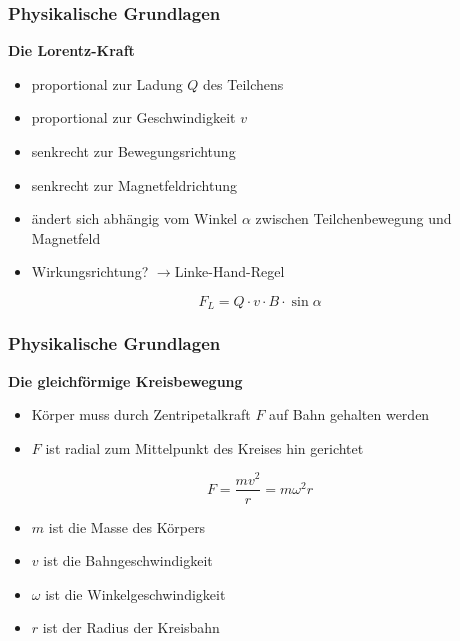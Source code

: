 \mode*

\begin{frame}
  \frametitle{Physikalische Grundlagen}
  \onslide<+->
  \textbf{Die Lorentz-Kraft}
  \begin{itemize}
    \item<+-> proportional zur Ladung \(Q\) des Teilchens
    \item<+-> proportional zur Geschwindigkeit \(v\)
    \item<+-> senkrecht zur Bewegungsrichtung
    \item<+-> senkrecht zur Magnetfeldrichtung
    \item<+-> \"andert sich abh\"angig vom Winkel \(\alpha\) zwischen Teilchenbewegung und Magnetfeld
    \item<+-> Wirkungsrichtung? \(\rightarrow\)Linke-Hand-Regel
  \end{itemize}
  \vspace*{\fill}
  \onslide<+->
  \begin{equation*}
    \label{eq:lorentz_abs}
    F_L = Q \cdot v \cdot B \cdot \sin{\alpha}
  \end{equation*}
  \vspace*{\fill}
\end{frame}

\begin{frame}
  \frametitle{Physikalische Grundlagen}
  \onslide<+->
  \textbf{Die gleichf\"ormige Kreisbewegung}
  \begin{itemize}
    \item<+-> K\"orper muss durch Zentripetalkraft \(F\) auf Bahn gehalten werden
    \item<+-> \(F\) ist radial zum Mittelpunkt des Kreises hin gerichtet
  \end{itemize}
  \vspace*{\fill}
  \onslide<+->
  \begin{equation*}
    \label{eq:zentripetalkraft}
    F = \frac{mv^2}{r} = m\omega^2r
  \end{equation*}
  \vspace*{\fill}
  \begin{itemize}
    \item<+-> \(m\) ist die Masse des K\"orpers
    \item<+-> \(v\) ist die Bahngeschwindigkeit
    \item<+-> \(\omega\) ist die Winkelgeschwindigkeit
    \item<+-> \(r\) ist der Radius der Kreisbahn
  \end{itemize}
\end{frame}

